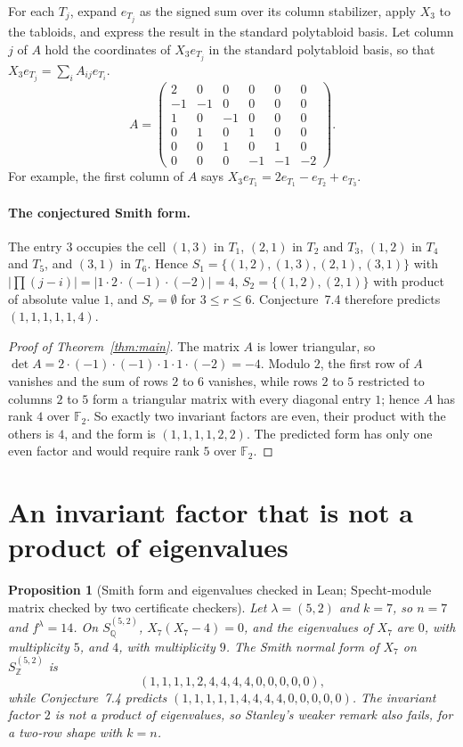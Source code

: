 \documentclass[11pt]{article}
\newtheorem{proposition}[theorem]{Proposition}
\theoremstyle{remark}
\newcommand{\Z}{\mathbb{Z}}
\newcommand{\Q}{\mathbb{Q}}
\newcommand{\F}{\mathbb{F}}
\begin{document}
For each $T_j$, expand $e_{T_j}$ as the signed sum over its column stabilizer, apply $X_3$ to the tabloids, and express the result in the standard polytabloid basis. Let column $j$ of $A$ hold the coordinates of $X_3e_{T_j}$ in the
standard polytabloid basis, so that $X_3e_{T_j}=\sum_i A_{ij}e_{T_i}$. \[
A=\begin{pmatrix}
 2& 0& 0& 0& 0& 0\\
-1&-1& 0& 0& 0& 0\\
 1& 0&-1& 0& 0& 0\\
 0& 1& 0& 1& 0& 0\\
 0& 0& 1& 0& 1& 0\\
 0& 0& 0&-1&-1&-2
\end{pmatrix}.
\]
For example, the first column of $A$ says
$X_3e_{T_1}=2e_{T_1}-e_{T_2}+e_{T_3}$.

\paragraph{The conjectured Smith form.} The entry $3$ occupies the cell $(1,3)$ in $T_1$,
$(2,1)$ in $T_2$ and $T_3$, $(1,2)$ in $T_4$ and $T_5$, and $(3,1)$ in $T_6$.
Hence $S_1=\{(1,2),(1,3),(2,1),(3,1)\}$ with
$|\prod(j-i)|=|1\cdot2\cdot(-1)\cdot(-2)|=4$, $S_2=\{(1,2),(2,1)\}$ with
product of absolute value $1$, and $S_r=\emptyset$ for $3\le r\le 6$.
Conjecture~7.4 therefore predicts $(1,1,1,1,1,4)$.

\begin{proof}[Proof of Theorem~\ref{thm:main}]
The matrix $A$ is
lower triangular, so $\det A=2\cdot(-1)\cdot(-1)\cdot1\cdot1\cdot(-2)=-4$.
Modulo $2$, the first row of $A$ vanishes and the sum of rows $2$ to $6$
vanishes, while rows $2$ to $5$ restricted to columns $2$ to $5$ form a
triangular matrix with every diagonal entry $1$; hence $A$ has rank $4$ over $\F_2$. So exactly two
invariant factors are even, their product with the others is $4$, and the
form is $(1,1,1,1,2,2)$. The predicted form has only one even factor and
would require rank $5$ over $\F_2$.
\end{proof}

\section{An invariant factor that is not a product of eigenvalues}\label{sec:52}
\begin{proposition}[Smith form and eigenvalues checked in Lean; Specht-module matrix checked by two certificate checkers]\label{prop:52}
Let $\lambda=(5,2)$ and $k=7$, so $n=7$ and $f^\lambda=14$. On
$S^{(5,2)}_\Q$, $X_7(X_7-4)=0$, and the eigenvalues of $X_7$ are $0$, with
multiplicity $5$, and $4$, with multiplicity $9$. The Smith normal form of
$X_7$ on $S^{(5,2)}_\Z$ is
\[
(1,1,1,1,2,4,4,4,4,0,0,0,0,0),
\]
while Conjecture~7.4 predicts $(1,1,1,1,1,4,4,4,4,0,0,0,0,0)$. The invariant
factor $2$ is not a product of eigenvalues, so Stanley's weaker remark also
fails, for a two-row shape with $k=n$.
\end{proposition}
\end{document}
